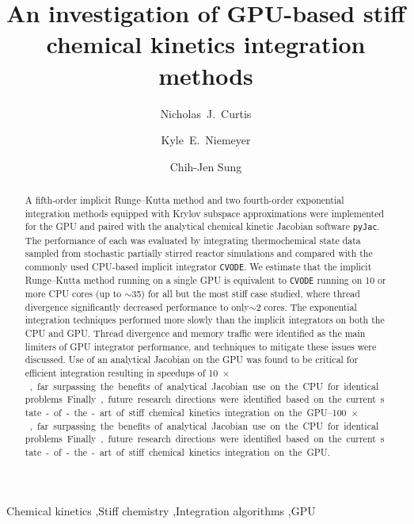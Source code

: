 \documentclass[preprint]{elsarticle}
\begin{document}
\begin{frontmatter}

\title{An investigation of GPU-based stiff chemical kinetics integration methods}

\author[uconn]{Nicholas~J.\ Curtis}
\author[osu]{Kyle~E.\ Niemeyer}
\author[uconn]{Chih-Jen Sung}

\address[uconn]{Department of Mechanical Engineering\\
  University of Connecticut, Storrs, CT, 06269, USA}
\address[osu]{School of Mechanical, Industrial, and Manufacturing Engineering\\
  Oregon State University, Corvallis, OR 97331, USA}
  

\begin{abstract}
A fifth-order implicit Runge--Kutta method and two fourth-order exponential integration methods equipped with Krylov subspace approximations were implemented for the GPU and paired with the analytical chemical kinetic Jacobian software \texttt{pyJac}.
The performance of each was evaluated by integrating thermochemical state data sampled from stochastic partially stirred reactor simulations and compared with the commonly used CPU-based implicit integrator \texttt{CVODE}.
We estimate that the implicit Runge--Kutta method running on a single GPU is equivalent to \texttt{CVODE} running on \num{10} or more CPU cores (up to $\sim$\num{35}) for all but the most stiff case studied, where thread divergence significantly decreased performance to only$\sim$\num{2} cores.
The exponential integration techniques performed more slowly than the implicit integrators on both the CPU and GPU.
Thread divergence and memory traffic were identified as the main limiters of GPU integrator performance, and techniques to mitigate these issues were discussed.
Use of an analytical Jacobian on the GPU was found to be critical for efficient integration resulting in speedups of \SIrange{10}{100}{$\times$}, far surpassing the benefits of analytical Jacobian use on the CPU for identical problems.
Finally, future research directions were identified based on the current state-of-the-art of stiff chemical kinetics integration on the GPU.
\end{abstract}

\begin{keyword}
 Chemical kinetics \sep Stiff chemistry \sep Integration algorithms \sep GPU
\end{keyword}

\end{frontmatter}
\end{document}
